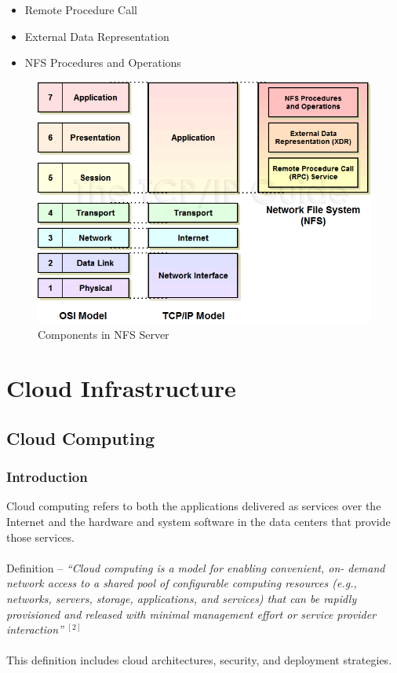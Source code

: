 \documentclass[12pt]{report}
\begin{document}
\begin{itemize}
\item Remote Procedure Call
\item External Data Representation	
\item NFS Procedures and Operations
\end{itemize}
\begin{figure}[H]
\begin{center}
\includegraphics[scale=0.7]{nfscomponents}
\end{center}
\caption{Components in NFS Server\label{fig:Components in NFS Server}}
\end{figure}

\chapter{Cloud Infrastructure}

\section{Cloud Computing}

\subsection{Introduction}

Cloud computing refers to both the applications delivered as services over the Internet and the hardware and system software in the data centers that provide those services. \\
\\
Definition -- \textit{``Cloud computing is a model for enabling convenient, on-
demand network access to a shared pool of configurable
computing resources (e.g., networks, servers, storage,
applications, and services) that can be rapidly provisioned
and released with minimal management effort or service
provider interaction''} $^{[2]}$ \\
\\
This definition includes cloud architectures, security, and deployment strategies. 
\end{document}
